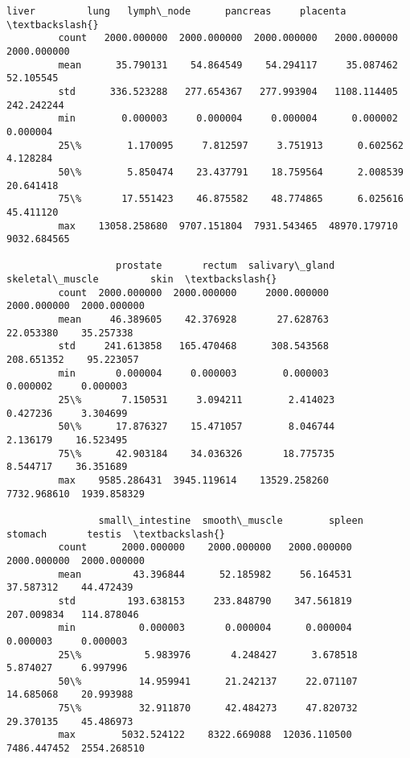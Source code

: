 \documentclass[11pt]{article}
\begin{document}
\begin{Verbatim}[commandchars=\\\{\}]
                       liver         lung   lymph\_node      pancreas     placenta  \textbackslash{}
         count   2000.000000  2000.000000  2000.000000   2000.000000  2000.000000   
         mean      35.790131    54.864549    54.294117     35.087462    52.105545   
         std      336.523288   277.654367   277.993904   1108.114405   242.242244   
         min        0.000003     0.000004     0.000004      0.000002     0.000004   
         25\%        1.170095     7.812597     3.751913      0.602562     4.128284   
         50\%        5.850474    23.437791    18.759564      2.008539    20.641418   
         75\%       17.551423    46.875582    48.774865      6.025616    45.411120   
         max    13058.258680  9707.151804  7931.543465  48970.179710  9032.684565   
         
                   prostate       rectum  salivary\_gland  skeletal\_muscle         skin  \textbackslash{}
         count  2000.000000  2000.000000     2000.000000      2000.000000  2000.000000   
         mean     46.389605    42.376928       27.628763        22.053380    35.257338   
         std     241.613858   165.470468      308.543568       208.651352    95.223057   
         min       0.000004     0.000003        0.000003         0.000002     0.000003   
         25\%       7.150531     3.094211        2.414023         0.427236     3.304699   
         50\%      17.876327    15.471057        8.046744         2.136179    16.523495   
         75\%      42.903184    34.036326       18.775735         8.544717    36.351689   
         max    9585.286431  3945.119614    13529.258260      7732.968610  1939.858329   
         
                small\_intestine  smooth\_muscle        spleen      stomach       testis  \textbackslash{}
         count      2000.000000    2000.000000   2000.000000  2000.000000  2000.000000   
         mean         43.396844      52.185982     56.164531    37.587312    44.472439   
         std         193.638153     233.848790    347.561819   207.009834   114.878046   
         min           0.000003       0.000004      0.000004     0.000003     0.000003   
         25\%           5.983976       4.248427      3.678518     5.874027     6.997996   
         50\%          14.959941      21.242137     22.071107    14.685068    20.993988   
         75\%          32.911870      42.484273     47.820732    29.370135    45.486973   
         max        5032.524122    8322.669088  12036.110500  7486.447452  2554.268510   
         

\end{Verbatim}
\end{document}
